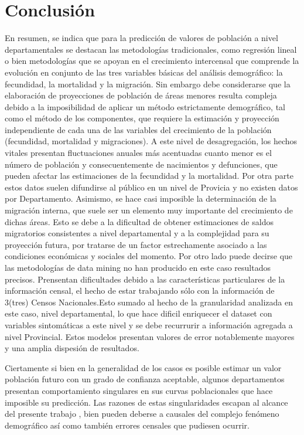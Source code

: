 \documentclass{article}
\theoremstyle{mytheoremstyle}
\theoremstyle{mytheoremstyle}
\theoremstyle{myproblemstyle}
\begin{document}
 \section{Conclusión} 
En resumen, se indica que para la predicción de valores de población a nivel departamentales
 se destacan las metodologías tradicionales, como regresión lineal o bien metodologías que se apoyan en el crecimiento intercensal que comprende la evolución en conjunto
 de las tres variables básicas del análisis demográfico: la fecundidad, la mortalidad y la migración.\newline
  Sin embargo debe
  considerarse que la elaboración de proyecciones de población de áreas menores resulta compleja debido a la imposibilidad de aplicar un método estrictamente demográfico, tal como el método de los componentes, que requiere la estimación y proyección independiente de cada una de las variables del crecimiento
 de la población (fecundidad, mortalidad y migraciones). A este nivel de desagregación, los hechos vitales
 presentan fluctuaciones anuales más acentuadas cuanto menor es el número de población y consecuentemente 
 de nacimientos y defunciones, que pueden afectar las estimaciones de la fecundidad y la mortalidad. Por otra parte estos datos suelen difundirse al público en un nivel de Provicia y no existen datos por Departamento.
 Asimismo, se hace casi imposible la determinación de la migración interna, que suele ser un
 elemento muy importante del crecimiento de dichas áreas. Esto se debe a la dificultad de obtener estimaciones 
 de saldos migratorios consistentes a nivel departamental y a la complejidad para su proyección futura,
 por tratarse de un factor estrechamente asociado a las condiciones económicas y sociales del momento.\newline
Por otro lado puede decirse que las metodologías de data mining no han producido en este caso resultados precisos.
 Prensentan dificultades debido a las características particulares de la información censal,
 el hecho de estar trabajando sólo con la información de 3(tres) Censos Nacionales.Esto sumado al hecho de la granularidad
analizada en este caso, nivel departamental, lo que hace dificil enriquecer el dataset con variables sintomáticas a este nivel y se debe recurrurir a información agregada
a nivel Provincial. Estos modelos presentan valores de error notablemente mayores y una amplia dispesión de resultados.\newline

Ciertamente si bien en la generalidad de los casos es posible estimar un valor población futuro con un grado de confianza aceptable,
 algunos departamentos presentan comportamiento singulares en sus curvas poblacionales que hace imposible su predicción. Las razones de estas singularidades
 escapan al alcance del presente trabajo , bien pueden deberse a causales del  complejo fenómeno demográfico así
  como también errores censales que pudiesen ocurrir.
\end{document}
